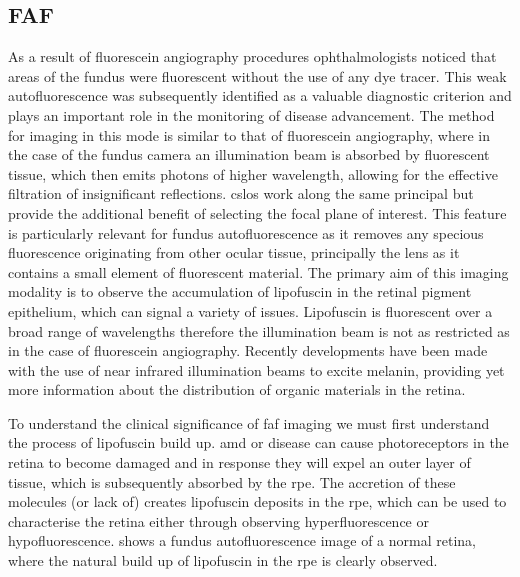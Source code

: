 \subsection{\Gls{FAF}}

As a result of fluorescein angiography procedures ophthalmologists noticed
that areas of the fundus were fluorescent without the use of any dye tracer.
This weak autofluorescence was subsequently identified as a valuable diagnostic
criterion and plays an important role in the monitoring of disease advancement.
The method for imaging in this mode is similar to that of fluorescein angiography,
where in the case of the fundus camera an illumination beam is absorbed by
fluorescent tissue, which then emits photons of higher wavelength, allowing
for the effective filtration of insignificant reflections. \gls{cslo}s work along
the same principal but provide the additional benefit of selecting the focal
plane of interest.\cite{schmitz2008fundus} This feature is particularly relevant
for fundus autofluorescence as it removes any specious fluorescence originating
from other ocular tissue, principally the lens as it contains a small element of
fluorescent material. \cite{von1995distribution} The primary aim of this imaging
modality is to observe the accumulation of lipofuscin in the retinal pigment
epithelium, which can signal a variety of issues. Lipofuscin is fluorescent over
a broad range of wavelengths therefore the illumination beam is not as restricted
as in the case of fluorescein angiography. Recently developments have been made
with the use of near infrared illumination beams to excite melanin, providing
yet more information about the distribution of organic materials in the retina.

To understand the clinical significance of \gls{faf} imaging we must first understand
the process of lipofuscin build up.\cite{kennedy1995lipofuscin} \Gls{amd} or disease can cause photoreceptors in the retina to become
damaged and in response they will expel an outer layer of tissue, which is
subsequently absorbed by the \Gls{rpe}.\cite{spaide2003fundus}
The accretion of these molecules (or lack of) creates lipofuscin deposits
in the \Gls{rpe}, which can be used to characterise the retina either through
observing hyperfluorescence or hypofluorescence.  shows a
fundus autofluorescence image of a normal retina, where the natural
build up of lipofuscin in the \Gls{rpe} is clearly observed.

